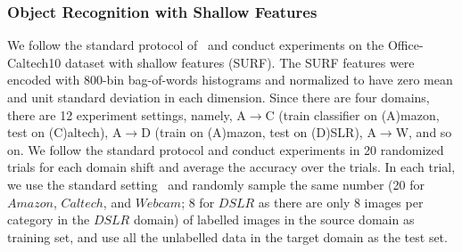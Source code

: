 \documentclass[letterpaper]{article}
\begin{document}
\begin{table}\Large
\centering
{}
\caption{\small Object recognition accuracies of all 12 domain shifts on the Office-Caltech10 dataset~\cite{gfk} with SURF features, following the protocol of~\cite{gfk,sasb,gopalan-iccv11,ref:kulis_cvpr11,saenko2010adapting}.}
\label{tab:result}
\end{table}

\subsubsection{Object Recognition with Shallow Features}
We follow the standard protocol of~\cite{gfk,sasb,gopalan-iccv11,ref:kulis_cvpr11,saenko2010adapting} and conduct experiments on the Office-Caltech10 dataset with shallow features (SURF).
The SURF features were encoded with 800-bin bag-of-words histograms and normalized to have zero mean and unit standard deviation in each dimension.  Since there are four domains, there are 12 experiment settings, namely, A$\rightarrow$C (train classifier on (A)mazon, test on (C)altech), A$\rightarrow$D (train on (A)mazon, test on (D)SLR), A$\rightarrow$W, and so on. We follow the standard protocol and conduct experiments in 20 randomized trials for each domain shift and average the accuracy over the trials. In each trial, we use the standard setting~\cite{gfk,sasb,gopalan-iccv11,ref:kulis_cvpr11,saenko2010adapting} and randomly sample the same number (20 for $Amazon$, $Caltech$, and $Webcam$; 8 for $DSLR$ as there are only 8 images per category in the $DSLR$ domain) of labelled images in the source domain as training set, and use all the unlabelled data in the target domain as the test set.
\end{document}
